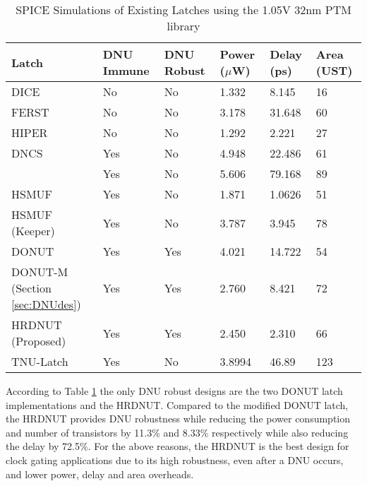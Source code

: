 \begin{table}[h]
\begin{center}
	\caption{SPICE Simulations of Existing Latches using the 1.05V 32nm PTM library }
	\label{table:rtable}
	\begin{tabular}{|m{5em}|m{3.5em}|m{3em}|m{3em}|m{3em}|m{3em}|}
	\hline
	Latch & DNU Immune & DNU Robust & Power ($\mu$W) & Delay (ps) & Area (UST)\\ 
	\hline
	DICE & No & No & 1.332 & 8.145 & 16 \\
	\hline
	FERST & No & No & 3.178 & 31.648 & 60 \\
	\hline
	HIPER & No & No & 1.292 & 2.221 & 27 \\
	\hhline{|=|=|=|=|=|=|}
	DNCS & Yes & No & 4.948 & 22.486 & 61 \\
	\hline
	\cite{Inter} & Yes & No & 5.606 & 79.168 & 89 \\
	\hline
	HSMUF & Yes & No & 1.871 & 1.0626 & 51 \\
	\hline
	HSMUF (Keeper) & Yes & No & 3.787 & 3.945 & 78 \\
	\hhline{|=|=|=|=|=|=|}
	DONUT \cite{DONUT} & Yes & Yes & 4.021 & 14.722 & 54 \\ 
	\hline
	DONUT-M (Section \ref{sec:DNUdes}) & Yes & Yes & 2.760 & 8.421 & 72\\
	\hline
	HRDNUT (Proposed) & Yes & Yes & 2.450 & 2.310 & 66 \\
	\hline
	TNU-Latch & Yes & No & 3.8994 & 46.89 & 123 \\
	\hline
	\end{tabular}
\end{center}
\end{table}

According to Table \ref{table:rtable} the only DNU robust designs are the two DONUT latch implementations and the HRDNUT. Compared to the modified DONUT latch, the HRDNUT provides DNU robustness while reducing the power consumption and number of transistors by 11.3\% and 8.33\% respectively while also reducing the delay by 72.5\%. For the above reasons, the HRDNUT is the best design for clock gating applications due to its high robustness, even after a DNU occurs, and lower power, delay and area overheads.